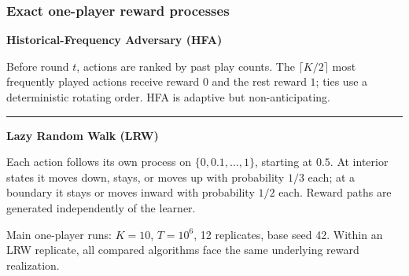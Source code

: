 \begin{frame}[noframenumbering]
  \frametitle{Exact one-player reward processes}

  \vspace{0.20cm}

  \footnotesize
  {\bfseries Historical-Frequency Adversary (HFA)}\par
  \vspace{0.30cm}
  Before round $t$, actions are ranked by past play counts. The $\lceil K/2\rceil$ most frequently played actions receive reward $0$ and the rest reward $1$; ties use a deterministic rotating order. HFA is adaptive but non-anticipating.

  \vspace{0.10cm}
  \textcolor{TUMblue}{\rule{\linewidth}{0.35pt}}
  \vspace{-0.10cm}

  {\bfseries Lazy Random Walk (LRW)}\par
  \vspace{0.30cm}
  Each action follows its own process on $\{0,0.1,\ldots,1\}$, starting at $0.5$. At interior states it moves down, stays, or moves up with probability $1/3$ each; at a boundary it stays or moves inward with probability $1/2$ each. Reward paths are generated independently of the learner.

  \vspace{0.30cm}
  {\scriptsize\textcolor{black!60}{
  Main one-player runs: $K=10$, $T=10^6$, 12 replicates, base seed 42.
  Within an LRW replicate, all compared algorithms face the same underlying reward realization.}}
\end{frame}
